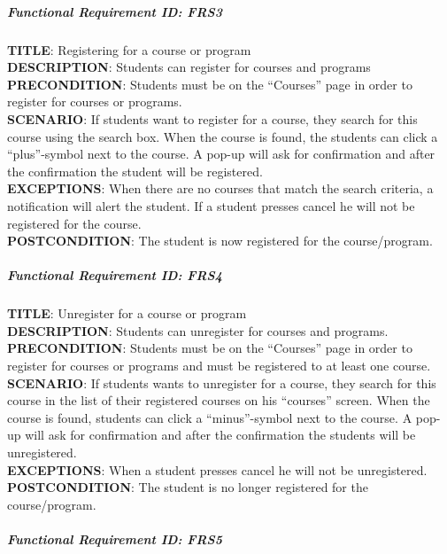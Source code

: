 \documentclass[12pt]{article}
\begin{document}
\subparagraph{Functional Requirement \textbf{ID}:
FRS3}\label{functional-requirement-id-frs3}

\textbf{TITLE}: Registering for a course or
program\\\textbf{DESCRIPTION}: Students can register for courses and
programs\\\textbf{PRECONDITION}: Students must be on the ``Courses''
page in order to register for courses or programs.\\\textbf{SCENARIO}:
If students want to register for a course, they search for this course
using the search box. When the course is found, the students can click a
``plus''-symbol next to the course. A pop-up will ask for confirmation
and after the confirmation the student will be
registered.\\\textbf{EXCEPTIONS}: When there are no courses that match
the search criteria, a notification will alert the student. If a student
presses cancel he will not be registered for the
course.\\\textbf{POSTCONDITION}: The student is now registered for the
course/program.

\subparagraph{Functional Requirement \textbf{ID}:
FRS4}\label{functional-requirement-id-frs4}

\textbf{TITLE}: Unregister for a course or
program\\\textbf{DESCRIPTION}: Students can unregister for courses and
programs.\\\textbf{PRECONDITION}: Students must be on the ``Courses''
page in order to register for courses or programs and must be registered
to at least one course.\\\textbf{SCENARIO}: If students wants to
unregister for a course, they search for this course in the list of
their registered courses on his ``courses'' screen. When the course is
found, students can click a ``minus''-symbol next to the course. A
pop-up will ask for confirmation and after the confirmation the students
will be unregistered.\\\textbf{EXCEPTIONS}: When a student presses
cancel he will not be unregistered.\\\textbf{POSTCONDITION}: The student
is no longer registered for the course/program.

\subparagraph{Functional Requirement \textbf{ID}:
FRS5}\label{functional-requirement-id-frs5}
\end{document}
